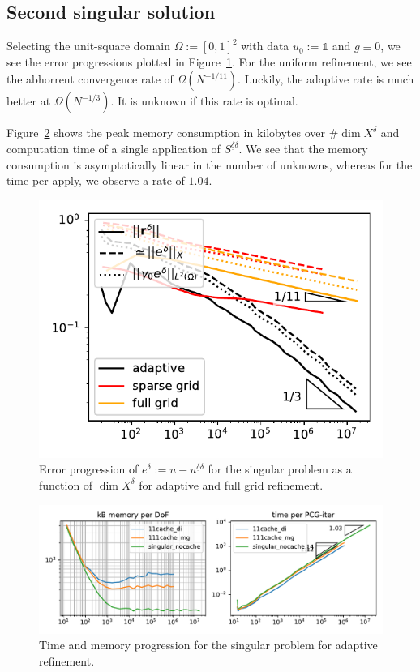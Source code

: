 \documentclass[11pt,a4paper,oneside,english]{amsart}
\numberwithin{equation}{section}
\numberwithin{theorem}{section}
\theoremstyle{definition}
\renewcommand{\O}{\Omega}
\newcommand{\udelta}{{\underline{\delta}}}
\newcommand{\jw}[1]{{\color{red}{JW: #1}}}
\newcommand{\bbone}{\mathds{1}}
\begin{document}
\subsection{Second singular solution}
Selecting the unit-square domain $\Omega := [0,1]^2$ with data $u_0 := \bbone$
and $g \equiv 0$, we see the error progressions plotted in Figure~\ref{fig:singular-error}.
For the uniform refinement, we see the abhorrent convergence rate of $\O(N^{-1/11})$.
Luckily, the adaptive rate is much better at $\O(N^{-1/3})$. It is unknown
if this rate is optimal.

Figure~\ref{fig:singular-time-memory} shows the peak memory consumption in kilobytes
over $\# \dim X^\delta$ and computation time of a single application of $S^{\udelta \delta}$.
We see that the memory consumption is asymptotically linear in the number of
unknowns, whereas for the time per apply, we observe a rate of $1.04$.\jw{dit is natuurlijk groter dan 1. Is het wel acceptabel?}

\begin{figure}
  \includegraphics[width=0.5\linewidth]{singular_adaptive_errors}
  \caption{Error progression of $e^\delta := u - u^{\underline{\delta}\delta}$ for the singular problem as
  a function of $\dim X^\delta$ for adaptive and full grid refinement.\jw{excuse the terrible graph}}
  \label{fig:singular-error}
\end{figure}
\begin{figure}
  \includegraphics[width=\linewidth]{singular_mem_time.pdf}
  \caption{Time and memory progression for the singular problem for adaptive refinement.\jw{excuse the terrible graph}}
  \label{fig:singular-time-memory}
\end{figure}





\end{document}
